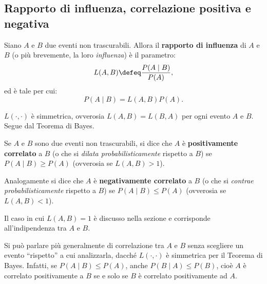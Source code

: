 \begin{multicols*}{2}
    \subsection{Rapporto di influenza, correlazione positiva e negativa}

    \begin{definition}
        Siano $A$ e $B$ due eventi non trascurabili. Allora
        il \textbf{rapporto di influenza} di $A$ e $B$
        (o più brevemente, la loro \textit{influenza}) è
        il parametro:
        \[
            L(A, B) \defeq \frac{P(A\mid B)}{P(A)},
        \]
        ed è tale per cui:
        \[
            P(A \mid B) = L(A, B) P(A).
        \]
    \end{definition}

    \begin{proposition}
        $L(\cdot, \cdot)$ è simmetrica, ovverosia $L(A, B) = L(B, A)$ per
        ogni evento $A$ e $B$. Segue dal Teorema di Bayes.
    \end{proposition}

    \begin{definition}
        Se $A$ e $B$ sono due eventi non trascurabili, si dice
        che $A$ è \textbf{positivamente correlato} a $B$ (o che
        si \textit{dilata probabilisticamente} rispetto a $B$) se
        $P(A \mid B) \geq P(A)$ (ovverosia se $L(A, B) > 1$). \smallskip
        
        Analogamente
        si dice che $A$ è \textbf{negativamente correlato} a $B$
        (o che si \textit{contrae probabilisticamente} rispetto a $B$) se
        $P(A \mid B) \leq P(A)$ (ovverosia se $L(A, B) < 1$).
    \end{definition}

    \begin{remark}
        Il caso in cui $L(A, B) = 1$ è discusso nella sezione \textit{} e corrisponde all'indipendenza
        tra $A$ e $B$.
    \end{remark}

    \begin{remark}
        Si può parlare più generalmente di correlazione tra $A$ e $B$
        senza scegliere un evento ``rispetto'' a cui analizzarla, dacché
        $L(\cdot, \cdot)$ è simmetrica per il Teorema di Bayes. Infatti,
        se $P(A \mid B) \leq P(A)$, anche $P(B \mid A) \leq P(B)$, cioè
        $A$ è correlato positivamente a $B$ se e solo se $B$ è correlato
        positivamente ad $A$. \smallskip



\end{remark}
\end{multicols*}
